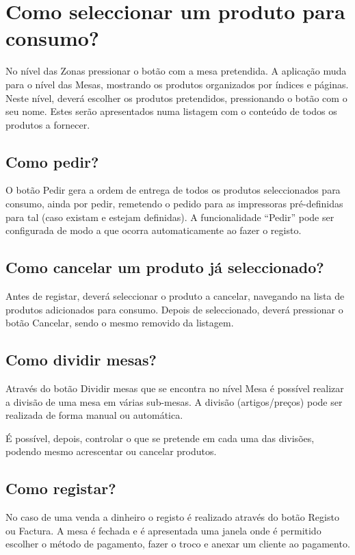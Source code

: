 \documentclass[a4paper,11pt,openany]{memoir}
\begin{document}
\section{Como seleccionar um produto para consumo?}

No nível das Zonas pressionar o botão com a mesa pretendida. A aplicação muda
para o nível das Mesas, mostrando os produtos organizados por índices e páginas.
Neste nível, deverá escolher os produtos pretendidos, pressionando o botão com o
seu nome. Estes serão apresentados numa listagem com o conteúdo de todos os
produtos a fornecer.


\subsection{Como pedir?}
O botão Pedir gera a ordem de entrega de todos os produtos seleccionados para
consumo, ainda por pedir, remetendo o pedido para as impressoras pré-definidas
para tal (caso existam e estejam definidas). A funcionalidade “Pedir” pode ser
configurada de modo a que ocorra automaticamente ao fazer o registo.

\subsection{Como cancelar um produto já seleccionado?}
Antes de registar, deverá seleccionar o produto a cancelar, navegando na lista de
produtos adicionados para consumo. Depois de seleccionado, deverá pressionar o
botão Cancelar, sendo o mesmo removido da listagem.


\subsection{Como dividir mesas?}
Através do botão Dividir mesas que se encontra no nível Mesa é possível realizar a
divisão de uma mesa em várias sub-mesas. A divisão (artigos/preços) pode ser
realizada de forma manual ou automática.

É possível, depois, controlar o que se pretende em cada uma das divisões, podendo mesmo acrescentar ou cancelar
produtos.


\subsection{Como registar?}
No caso de uma venda a dinheiro o registo é realizado através do botão Registo ou
Factura. A mesa é fechada e é apresentada uma janela onde é permitido escolher o
método de pagamento, fazer o troco e anexar um cliente ao pagamento.
\end{document}
